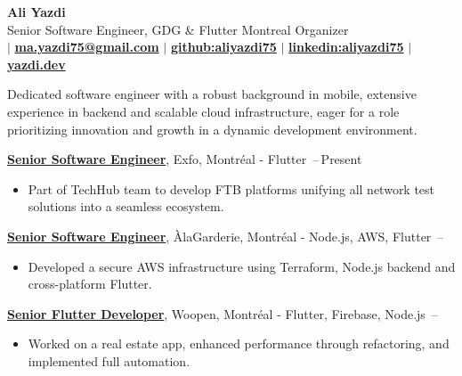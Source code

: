 \documentclass[letterpaper,11pt]{article}
\makeatletter
\newcommand{\CVAuthor}{Ali Yazdi}
\newcommand{\TitleDesciption}{Senior Software Engineer, GDG \& Flutter Montreal Organizer}
\newcommand{\CVWebpageName}{yazdi.dev}
\newcommand{\CVWebpage}{https://yazdi.dev}
\newcommand{\MainEmailName}{ma.yazdi75@gmail.com}
\newcommand{\MainEmail}{mailto:ma.yazdi75@gmail.com}
\newcommand{\LinkedinName}{linkedin:aliyazdi75}
\newcommand{\Linkedin}{https://linkedin.com/in/aliyazdi75}
\newcommand{\GithubName}{github:aliyazdi75}
\newcommand{\Github}{https://github.com/aliyazdi75}
\newcommand{\PhoneName}{}
\newcommand{\Phone}{}
\makeatother
\begin{document}

\begin{center}
    \textbf{\Huge \CVAuthor} \\
    \vspace{1mm}
    \TitleDesciption \\
    \small {\txtcolor\href{\Phone}{\textbf{\PhoneName}}}
    $\vert$
    {\txtcolor\href{\MainEmail}{\textbf{\MainEmailName}}}
    $\vert$
    {\txtcolor\href{\Github}{\textbf{\GithubName}}}
    $\vert$
    {\txtcolor\href{\Linkedin}{\textbf{\LinkedinName}}}
    $\vert$
    {\txtcolor\href{\CVWebpage}{\textbf{\CVWebpageName}}}
\end{center}



Dedicated software engineer with a robust background in mobile, extensive experience
in backend and scalable cloud infrastructure, eager for a role prioritizing innovation and growth in a dynamic development environment.



\href{https://exfo.com}
{\textbf{Senior Software Engineer}}, Exfo, Montréal - Flutter
\hfill {}\,--\,Present
\begin{itemize}[leftmargin=*, noitemsep, topsep=0pt, partopsep=0pt]
    \item Part of TechHub team to develop FTB platforms unifying all network test solutions into a seamless ecosystem.
\end{itemize}

\href{https://alagarderie.ca}
{\textbf{Senior Software Engineer}}, ÀlaGarderie, Montréal - Node.js, AWS, Flutter
\hfill {}\,--\,
\begin{itemize}[leftmargin=*, noitemsep, topsep=0pt, partopsep=0pt]
    \item Developed a secure AWS infrastructure using Terraform, Node.js backend and cross-platform Flutter.
\end{itemize}

\href{https://woopen.com}
{\textbf{Senior Flutter Developer}}, Woopen, Montréal - Flutter, Firebase, Node.js
\hfill {}\,--\,
\begin{itemize}[leftmargin=*, noitemsep, topsep=0pt, partopsep=0pt]
    \item Worked on a real estate app, enhanced performance through refactoring, and implemented full automation.
\end{itemize}
\end{document}
